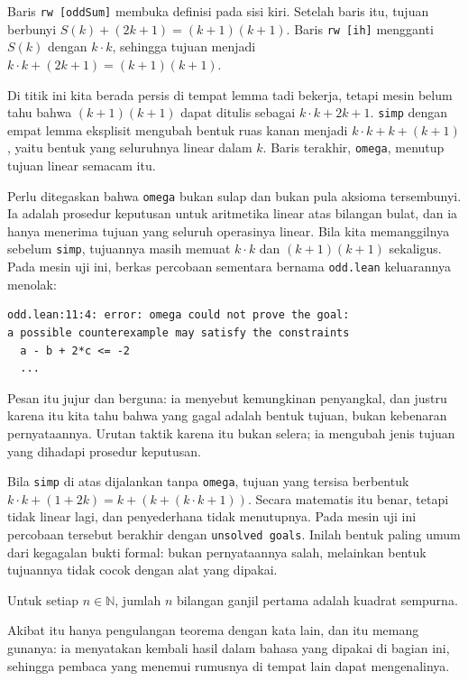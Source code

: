 Baris \texttt{rw [oddSum]} membuka definisi pada sisi kiri. Setelah baris itu, tujuan berbunyi
$S(k)+(2k+1)=(k+1)(k+1)$. Baris \texttt{rw [ih]} mengganti $S(k)$ dengan $k\cdot k$, sehingga
tujuan menjadi $k\cdot k+(2k+1)=(k+1)(k+1)$.

Di titik ini kita berada persis di tempat lemma tadi bekerja, tetapi mesin belum tahu bahwa
$(k+1)(k+1)$ dapat ditulis sebagai $k\cdot k+2k+1$. \texttt{simp} dengan empat lemma eksplisit
mengubah bentuk ruas kanan menjadi $k\cdot k+k+(k+1)$, yaitu bentuk yang seluruhnya linear dalam
$k$. Baris terakhir, \texttt{omega}, menutup tujuan linear semacam itu.

Perlu ditegaskan bahwa \texttt{omega} bukan sulap dan bukan pula aksioma tersembunyi. Ia adalah
prosedur keputusan untuk aritmetika linear atas bilangan bulat, dan ia hanya menerima tujuan yang
seluruh operasinya linear. Bila kita memanggilnya sebelum \texttt{simp}, tujuannya masih memuat
$k\cdot k$ dan $(k+1)(k+1)$ sekaligus. Pada mesin uji ini, berkas percobaan sementara bernama
\texttt{odd.lean} keluarannya menolak:

\begin{verbatim}
odd.lean:11:4: error: omega could not prove the goal:
a possible counterexample may satisfy the constraints
  a - b + 2*c <= -2
  ...
\end{verbatim}

Pesan itu jujur dan berguna: ia menyebut kemungkinan penyangkal, dan justru karena itu kita tahu
bahwa yang gagal adalah bentuk tujuan, bukan kebenaran pernyataannya. Urutan taktik karena itu
bukan selera; ia mengubah jenis tujuan yang dihadapi prosedur keputusan.

\begin{catatan}
Bila \texttt{simp} di atas dijalankan tanpa \texttt{omega}, tujuan yang tersisa berbentuk
$k\cdot k+(1+2k)=k+(k+(k\cdot k+1))$. Secara matematis itu benar, tetapi tidak linear lagi, dan
penyederhana tidak menutupnya. Pada mesin uji ini percobaan tersebut berakhir dengan
\texttt{unsolved goals}. Inilah bentuk paling umum dari kegagalan bukti formal: bukan
pernyataannya salah, melainkan bentuk tujuannya tidak cocok dengan alat yang dipakai.
\end{catatan}

\begin{akibat}
Untuk setiap $n\in\mathbb{N}$, jumlah $n$ bilangan ganjil pertama adalah kuadrat sempurna.
\end{akibat}

Akibat itu hanya pengulangan teorema dengan kata lain, dan itu memang gunanya: ia menyatakan
kembali hasil dalam bahasa yang dipakai di bagian ini, sehingga pembaca yang menemui rumusnya di
tempat lain dapat mengenalinya.

